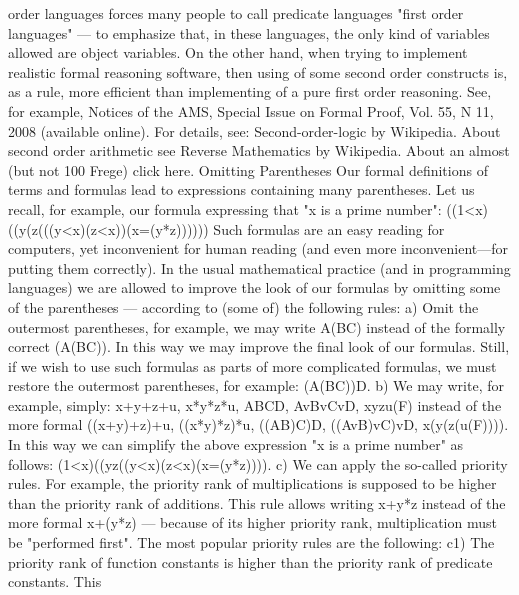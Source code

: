 order languages forces many people to call predicate languages "first order languages" --- to emphasize that, in these
languages, the only kind of variables allowed are object variables.
On the other hand, when trying to implement realistic formal reasoning software, then using of some second order constructs
is, as a rule, more efficient than implementing of a pure first order reasoning. See, for example, Notices of the AMS, Special
Issue on Formal Proof, Vol. 55, N 11, 2008 (available online).
For details, see: Second-order-logic by Wikipedia. About second order arithmetic see Reverse Mathematics by Wikipedia.
About an almost (but not 100%
Frege) click here.
Omitting Parentheses
Our formal definitions of terms and formulas lead to expressions containing many parentheses. Let us
recall, for example, our formula expressing that "x is a prime number":
((1<x)\AND (\neg (\exists y(\exists z(((y<x)\AND (z<x))\AND (x=(y*z))))))
Such formulas are an easy reading for computers, yet inconvenient for human reading (and even more
inconvenient---for putting them correctly). In the usual mathematical practice (and in programming
languages) we are allowed to improve the look of our formulas by omitting some of the parentheses ---
according to (some of) the following rules:
a) Omit the outermost parentheses, for example, we may write A\IMPLIES (B\IMPLIES C) instead of the formally correct
(A\IMPLIES (B\IMPLIES C)). In this way we may improve the final look of our formulas. Still, if we wish to use such
formulas as parts of more complicated formulas, we must restore the outermost parentheses, for example:
(A\IMPLIES (B\IMPLIES C))\IMPLIES D.
b) We may write, for example, simply:
x+y+z+u, x*y*z*u, A\AND B\AND C\AND D, AvBvCvD, \exists x\forall y\exists z\forall u(F)
instead of the more formal
((x+y)+z)+u, ((x*y)*z)*u, ((A\AND B)\AND C)\AND D, ((AvB)vC)vD, \exists x(\forall y(\exists z(\forall u(F)))).
In this way we can simplify the above expression "x is a prime number" as follows:
(1<x)\AND (\neg (\exists y\exists z((y<x)\AND (z<x)\AND (x=(y*z)))).
c) We can apply the so-called priority rules. For example, the priority rank of multiplications is supposed
to be higher than the priority rank of additions. This rule allows writing x+y*z instead of the more formal
x+(y*z) --- because of its higher priority rank, multiplication must be "performed first". The most popular
priority rules are the following:
c1) The priority rank of function constants is higher than the priority rank of predicate constants. This

